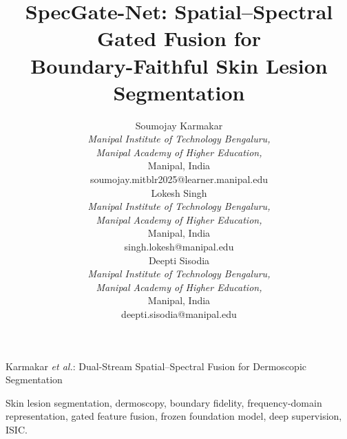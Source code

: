 \documentclass[journal]{IEEEtran}
\begin{document}
\title{SpecGate-Net: Spatial--Spectral Gated Fusion for\\
       Boundary-Faithful Skin Lesion Segmentation}

\author{%
\begin{minipage}[t]{0.32\textwidth}\centering
Soumojay Karmakar\\
\textit{Manipal Institute of Technology Bengaluru,}\\
\textit{Manipal Academy of Higher Education,}\\
Manipal, India\\
{\small soumojay.mitblr2025@learner.manipal.edu}
\end{minipage}\hfill
\begin{minipage}[t]{0.32\textwidth}\centering
Lokesh Singh\\
\textit{Manipal Institute of Technology Bengaluru,}\\
\textit{Manipal Academy of Higher Education,}\\
Manipal, India\\
{\small singh.lokesh@manipal.edu}
\end{minipage}\hfill
\begin{minipage}[t]{0.32\textwidth}\centering
Deepti Sisodia\\
\textit{Manipal Institute of Technology Bengaluru,}\\
\textit{Manipal Academy of Higher Education,}\\
Manipal, India\\
{\small deepti.sisodia@manipal.edu}
\end{minipage}%
}

\markboth{}%
{Karmakar \MakeLowercase{\textit{et al.}}: Dual-Stream Spatial--Spectral Fusion for Dermoscopic Segmentation}

\maketitle

\vspace*{-12pt}



\begin{IEEEkeywords}
Skin lesion segmentation, dermoscopy, boundary fidelity, frequency-domain
representation, gated feature fusion, frozen foundation model, deep supervision,
ISIC.
\end{IEEEkeywords}

\IEEEpeerreviewmaketitle











\end{document}
